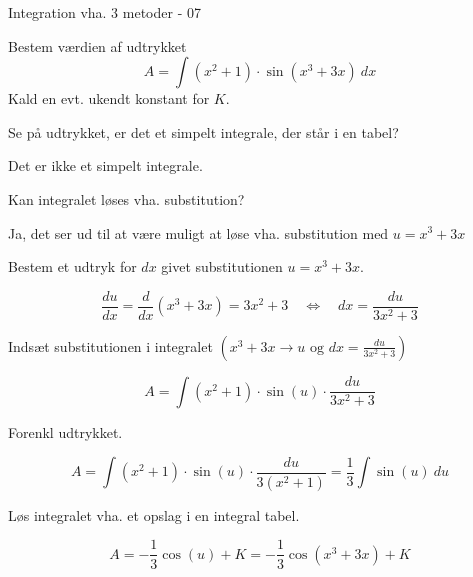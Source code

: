 \documentclass{article}
\begin{document}
\begin{exercise}{Integration vha. 3 metoder - 07}

Bestem værdien af udtrykket
\[
A = \int (x^2 + 1) \cdot \sin(x^3 + 3x) \ dx
\]
Kald en evt. ukendt konstant for $K$.


\hint
Se på udtrykket, er det et simpelt integrale, der står i en tabel?

\hint
Det er ikke et simpelt integrale.

\hint
Kan integralet løses vha. substitution?

\hint
Ja, det ser ud til at være muligt at løse vha. substitution med $u=x^3 + 3x$

\hint
Bestem et udtryk for $dx$ givet substitutionen $u=x^3 + 3x$.

\hint
\[
\frac{du}{dx} = \frac{d}{dx} \left(x^3 + 3x \right) = 3x^2 +3 \quad \Leftrightarrow \quad dx = \frac{du}{3x^2 + 3}
\]

\hint
Indsæt substitutionen i integralet $\left(x^3 + 3x \rightarrow u \textrm{ og } dx = \frac{du}{3x^2 + 3} \right)$

\hint
\[
A = \int (x^2 + 1) \cdot \sin(u) \cdot \frac{du}{3x^2 + 3}
\]

\hint
Forenkl udtrykket.

\hint
\[
A= \int (x^2 + 1) \cdot \sin(u) \cdot \frac{du}{3(x^2 + 1)} = \frac{1}{3} \int \sin(u) \ du
\]

\hint
Løs integralet vha. et opslag i en integral tabel.

\hint
\[
A = - \frac{1}{3} \cos(u) + K = - \frac{1}{3} \cos(x^3 + 3x) + K
\]


\end{exercise}

\newpage
\end{document}
